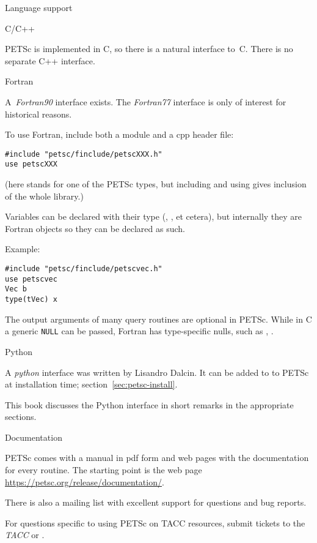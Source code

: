 {Language support}

 {C/C++}

PETSc is implemented in C, so there is a natural interface
to~C. There is no separate C++ interface.

 {Fortran}

A~\emph{Fortran90}
interface exists. The \emph{Fortran77}
interface is only of
interest for historical reasons.

To use Fortran, include both a module and a cpp header file:
\begin{verbatim}
#include "petsc/finclude/petscXXX.h"
use petscXXX
\end{verbatim}
(here  stands for one of the PETSc types, but including
 and using 
gives inclusion of the whole library.)

Variables can be declared with their type (,
,  et cetera), but internally they are
Fortran  objects so they can be declared as such.

Example:
\begin{lstlisting}
#include "petsc/finclude/petscvec.h"
use petscvec
Vec b
type(tVec) x
\end{lstlisting}

The output arguments of many query routines are optional in PETSc.
While in C a generic \lstinline{NULL} can be passed,
Fortran has type-specific nulls, such as
, .

 {Python}
\label{sec:py-interface}

A \emph{python} interface was written by
Lisandro Dalcin.
It can be added to to PETSc at installation time;
section~\ref{sec:petsc-install}.

This book discusses the Python interface
in short remarks in the appropriate sections.

 {Documentation}

PETSc comes with a manual in pdf form and web pages with the
documentation for every routine. The starting point is the web page
\url{https://petsc.org/release/documentation/}.

There is also a mailing list with excellent support for questions and
bug reports.
\begin{taccnote}
  For questions specific to using PETSc on TACC resources, submit
  tickets to the \emph{TACC} or
  .
\end{taccnote}

